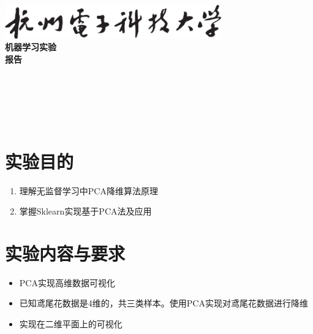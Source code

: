 \documentclass[a4paper]{ctexart}
\begin{document}
  \begin{titlepage}
      \songti
      \begin{center}
        \vspace*{2cm}
        \includegraphics[width=0.7\textwidth]{../HDU.png}\\
        \vspace*{1cm}
        {\fontsize{36pt}{0}
          \textbf{机器学习实验\\报\quad 告\\}
        }
        \vspace*{12cm}
        {\fontsize{18pt}{0}
           \underline{}\\
          \vspace*{0.5cm}
           \underline{}\\
          \vspace*{0.5cm}
           \underline{}\\
          \vspace*{0.5cm}
           \underline{}\\
          \vspace*{0.5cm}
           \underline{}\\
        }
      \end{center}
  \end{titlepage}


  \newpage
  \section{实验目的}
  \begin{enumerate}
    \item 理解无监督学习中PCA降维算法原理
    \item 掌握Sklearn实现基于PCA法及应用
  \end{enumerate}

  \section{实验内容与要求}
    \begin{itemize}
      \item PCA实现高维数据可视化
      \item 已知鸢尾花数据是4维的，共三类样本。使用PCA实现对鸢尾花数据进行降维
      \item 实现在二维平面上的可视化
    \end{itemize}
\end{document}
